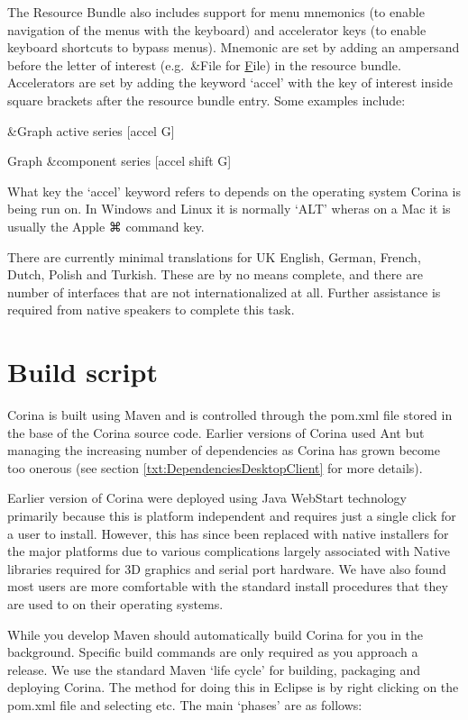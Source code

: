 The Resource Bundle also includes support for menu mnemonics (to enable navigation of the menus with the keyboard) and accelerator keys (to enable keyboard shortcuts to bypass menus).  Mnemonic are set by adding an ampersand before the letter of interest (e.g.\ {\&}File for \underline{F}ile) in the resource bundle.  Accelerators are set by adding the keyword `accel' with the key of interest inside square brackets after the resource bundle entry.  Some examples include:

\begin{itemize*}
 \item {\&}Graph active series [accel G]
 \item Graph {\&}component series [accel shift G]
\end{itemize*}

What key the `accel' keyword refers to depends on the operating system Corina is being run on.  In Windows and Linux it is normally `ALT' wheras on a Mac it is usually the Apple ⌘ command key. 


There are currently minimal translations for UK English, German, French, Dutch, Polish and Turkish.  These are by no means complete, and there are number of interfaces that are not internationalized at all.  Further assistance is required from native speakers to complete this task.

\section{Build script}
\label{txt:buildScript}
Corina is built using Maven and is controlled through the pom.xml file stored in the base of the Corina source code.  Earlier versions of Corina used Ant but managing the increasing number of dependencies as Corina has grown become too onerous (see section \ref{txt:DependenciesDesktopClient} for more details). 

Earlier version of Corina were deployed using Java WebStart technology primarily because this is platform independent and requires just a single click for a user to install.  However, this has since been replaced with native installers for the major platforms due to various complications largely associated with Native libraries required for 3D graphics and serial port hardware.  We have also found most users are more comfortable with the standard install procedures that they are used to on their operating systems.

While you develop Maven should automatically build Corina for you in the background.  Specific build commands are only required as you approach a release.  We use the standard Maven `life cycle' for building, packaging and deploying Corina.  The method for doing this in Eclipse is by right clicking on the pom.xml file and selecting  etc.  The main `phases' are as follows:

